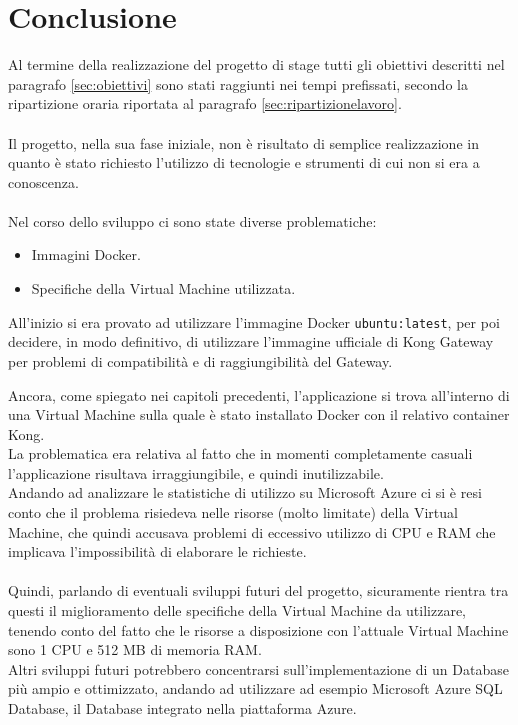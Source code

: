 \chapter*{Conclusione} %
Al termine della realizzazione del progetto di stage tutti gli obiettivi descritti nel paragrafo \ref{sec:obiettivi} sono stati raggiunti nei tempi prefissati, 
secondo la ripartizione oraria riportata al paragrafo \ref{sec:ripartizionelavoro}.\\ \\

Il progetto, nella sua fase iniziale, non è risultato di semplice realizzazione in quanto è stato richiesto l'utilizzo di tecnologie e strumenti di cui non si era a conoscenza.\\ \\

Nel corso dello sviluppo ci sono state diverse problematiche:
\begin{itemize}
\item Immagini Docker.
\item Specifiche della Virtual Machine utilizzata.
\end{itemize}

All'inizio si era provato ad utilizzare l'immagine Docker \texttt{ubuntu:latest}, per poi decidere, in modo definitivo, di utilizzare l'immagine ufficiale di Kong Gateway 
per problemi di compatibilità e di raggiungibilità del Gateway.

Ancora, come spiegato nei capitoli precedenti, l'applicazione si trova all'interno di una Virtual Machine sulla quale è stato installato Docker con il relativo container Kong.\\
La problematica era relativa al fatto che in momenti completamente casuali l'applicazione risultava irraggiungibile, e quindi inutilizzabile.\\ 
Andando ad analizzare le statistiche di utilizzo su Microsoft Azure ci si è resi conto che il problema risiedeva nelle risorse (molto limitate) della Virtual Machine, 
che quindi accusava problemi di eccessivo utilizzo di CPU e RAM che implicava l'impossibilità di elaborare le richieste.\\ \\ 

Quindi, parlando di eventuali sviluppi futuri del progetto, sicuramente rientra tra questi il miglioramento delle specifiche della Virtual Machine da utilizzare,
 tenendo conto del fatto che le risorse a disposizione con l'attuale Virtual Machine sono 1 CPU e 512 MB di memoria RAM.\\
Altri sviluppi futuri potrebbero concentrarsi sull'implementazione di un Database più ampio e ottimizzato, andando ad utilizzare ad esempio Microsoft Azure SQL Database, 
il Database integrato nella piattaforma Azure.
